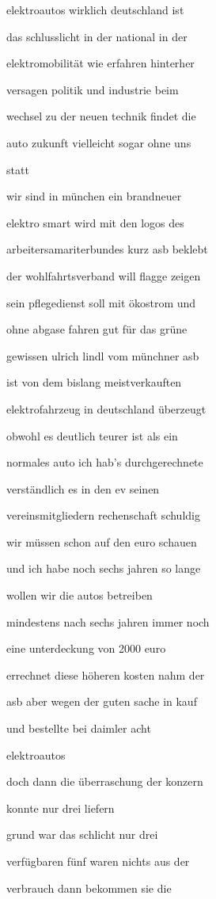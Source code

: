 \documentclass[a4paper, 11pt]{book} %
\begin{document}
elektroautos wirklich deutschland ist

das schlusslicht in der national in der

elektromobilität wie erfahren hinterher

versagen politik und industrie beim

wechsel zu der neuen technik findet die

auto zukunft vielleicht sogar ohne uns

statt

wir sind in münchen ein brandneuer

elektro smart wird mit den logos des

arbeitersamariterbundes kurz asb beklebt

der wohlfahrtsverband will flagge zeigen

sein pflegedienst soll mit ökostrom und

ohne abgase fahren gut für das grüne

gewissen ulrich lindl vom münchner asb

ist von dem bislang meistverkauften

elektrofahrzeug in deutschland überzeugt

obwohl es deutlich teurer ist als ein

normales auto ich hab's durchgerechnete

verständlich es in den ev seinen

vereinsmitgliedern rechenschaft schuldig

wir müssen schon auf den euro schauen

und ich habe noch sechs jahren so lange

wollen wir die autos betreiben

mindestens nach sechs jahren immer noch

eine unterdeckung von 2000 euro

errechnet diese höheren kosten nahm der

asb aber wegen der guten sache in kauf

und bestellte bei daimler acht

elektroautos

doch dann die überraschung der konzern

konnte nur drei liefern

grund war das schlicht nur drei

verfügbaren fünf waren nichts aus der

verbrauch dann bekommen sie die
\end{document}
